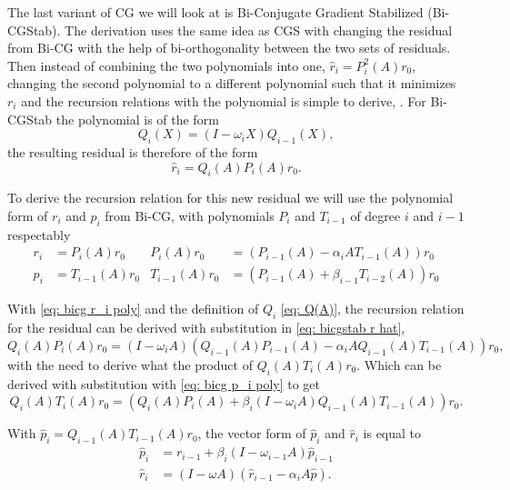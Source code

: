 The last variant of CG we will look at is Bi-Conjugate Gradient Stabilized (Bi-CGStab). The derivation uses the same idea as CGS with changing the residual from Bi-CG with the help of bi-orthogonality between the  two sets of residuals. Then instead of combining the two polynomials into one, \(\hat{r}_i=P_i^2(A)r_0\), changing the second polynomial to a different polynomial such that it minimizes \(r_i\) and the recursion relations with the polynomial is simple to derive, \cite{Saad2003}. For Bi-CGStab the polynomial is of the form
\begin{equation}\label{eq: Q(A)}
    Q_i(X)=(I-\omega_iX)Q_{i-1}(X),
\end{equation}
the resulting residual is therefore of the form 
\begin{equation}\label{eq: bicgstab r hat}
    \hat{r}_i=Q_i(A)P_i(A)r_0.
\end{equation} 

To derive the recursion relation for this new residual we will use the polynomial form of \(r_i\) and \(p_i\) from Bi-CG, with polynomials \(P_i\) and \(T_{i-1}\) of degree \(i\) and \(i-1\) respectably
\begin{align}
    r_i&=P_i(A)r_0 &P_i(A)r_0&=(P_{i-1}(A)-\alpha_i AT_{i-1}(A))r_0\label{eq: bicg r_i poly}\\
    p_i&=T_{i-1}(A)r_0 &T_{i-1}(A)r_0&=(P_{i-1}(A)+\beta_{i-1}T_{i-2}(A))r_0\label{eq: bicg p_i poly}
\end{align}

With \eqref{eq: bicg r_i poly} and the definition of \(Q_i\) \eqref{eq: Q(A)}, the recursion relation for the residual can be derived with substitution in \eqref{eq: bicgstab r hat},
\begin{equation*}
    Q_i(A)P_i(A)r_0=(I-\omega_i A)(Q_{i-1}(A)P_{i-1}(A)-\alpha_i A Q_{i-1}(A)T_{i-1}(A))r_0,
\end{equation*}
with the need to derive what the product of \(Q_i(A)T_i(A)r_0\). Which can be derived with substitution with \eqref{eq: bicg p_i poly} to get
\begin{equation*}
    Q_i(A)T_i(A)r_0=(Q_i(A)P_i(A)+\beta_i(I-\omega_iA)Q_{i-1}(A)T_{i-1}(A))r_0.
\end{equation*}

\noindent With \(\hat{p}_i=Q_{i-1}(A)T_{i-1}(A)r_0\), the vector form of \(\hat{p}_i\) and \(\hat{r}_i\) is equal to
\begin{align}
    \hat{p}_i&=r_{i-1}+\beta_i(I-\omega_{i-1}A)\hat{p}_{i-1}\\
    \hat{r}_i&=(I-\omega A)(\hat{r}_{i-1}-\alpha_i A\hat{p})\label{eq: r=(i-oA)(r-aAp)}.
\end{align}


